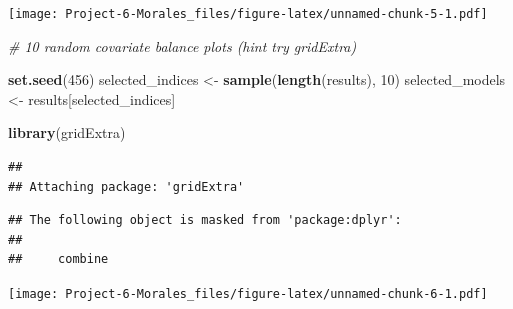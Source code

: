 \documentclass[
]{article}
\newenvironment{Shaded}{\begin{snugshade}}{\end{snugshade}}
\newcommand{\AttributeTok}[1]{\textcolor[rgb]{0.13,0.29,0.53}{#1}}
\newcommand{\CommentTok}[1]{\textcolor[rgb]{0.56,0.35,0.01}{\textit{#1}}}
\newcommand{\ConstantTok}[1]{\textcolor[rgb]{0.56,0.35,0.01}{#1}}
\newcommand{\ControlFlowTok}[1]{\textcolor[rgb]{0.13,0.29,0.53}{\textbf{#1}}}
\newcommand{\DecValTok}[1]{\textcolor[rgb]{0.00,0.00,0.81}{#1}}
\newcommand{\FloatTok}[1]{\textcolor[rgb]{0.00,0.00,0.81}{#1}}
\newcommand{\FunctionTok}[1]{\textcolor[rgb]{0.13,0.29,0.53}{\textbf{#1}}}
\newcommand{\NormalTok}[1]{#1}
\newcommand{\OtherTok}[1]{\textcolor[rgb]{0.56,0.35,0.01}{#1}}
\newcommand{\SpecialCharTok}[1]{\textcolor[rgb]{0.81,0.36,0.00}{\textbf{#1}}}
\begin{document}
\texttt{[image: Project-6-Morales\_files/figure-latex/unnamed-chunk-5-1.pdf]}

\begin{Shaded}
\begin{Highlighting}[]
\CommentTok{\# 10 random covariate balance plots (hint try gridExtra)}


\FunctionTok{set.seed}\NormalTok{(}\DecValTok{456}\NormalTok{) }
\NormalTok{selected\_indices }\OtherTok{\textless{}{-}} \FunctionTok{sample}\NormalTok{(}\FunctionTok{length}\NormalTok{(results), }\DecValTok{10}\NormalTok{)}
\NormalTok{selected\_models }\OtherTok{\textless{}{-}}\NormalTok{ results[selected\_indices]}

\FunctionTok{library}\NormalTok{(gridExtra)}
\end{Highlighting}
\end{Shaded}

\begin{verbatim}
## 
## Attaching package: 'gridExtra'
\end{verbatim}

\begin{verbatim}
## The following object is masked from 'package:dplyr':
## 
##     combine
\end{verbatim}

\begin{Shaded}
\end{Shaded}

\texttt{[image: Project-6-Morales\_files/figure-latex/unnamed-chunk-6-1.pdf]}
\end{document}
